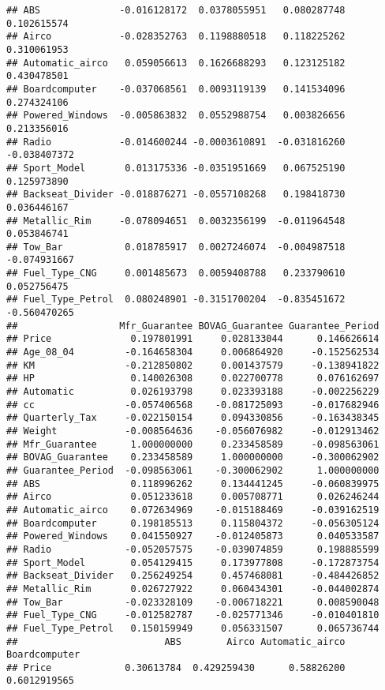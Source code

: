 \documentclass[]{article}
\begin{document}
\begin{verbatim}
## ABS              -0.016128172  0.0378055951   0.080287748  0.102615574
## Airco            -0.028352763  0.1198880518   0.118225262  0.310061953
## Automatic_airco   0.059056613  0.1626688293   0.123125182  0.430478501
## Boardcomputer    -0.037068561  0.0093119139   0.141534096  0.274324106
## Powered_Windows  -0.005863832  0.0552988754   0.003826656  0.213356016
## Radio            -0.014600244 -0.0003610891  -0.031816260 -0.038407372
## Sport_Model       0.013175336 -0.0351951669   0.067525190  0.125973890
## Backseat_Divider -0.018876271 -0.0557108268   0.198418730  0.036446167
## Metallic_Rim     -0.078094651  0.0032356199  -0.011964548  0.053846741
## Tow_Bar           0.018785917  0.0027246074  -0.004987518 -0.074931667
## Fuel_Type_CNG     0.001485673  0.0059408788   0.233790610  0.052756475
## Fuel_Type_Petrol  0.080248901 -0.3151700204  -0.835451672 -0.560470265
##                  Mfr_Guarantee BOVAG_Guarantee Guarantee_Period
## Price              0.197801991     0.028133044      0.146626614
## Age_08_04         -0.164658304     0.006864920     -0.152562534
## KM                -0.212850802     0.001437579     -0.138941822
## HP                 0.140026308     0.022700778      0.076162697
## Automatic          0.026193798     0.023393188     -0.002256229
## cc                -0.057406568    -0.081725093     -0.017682946
## Quarterly_Tax     -0.022150154     0.094330856     -0.163438345
## Weight            -0.008564636    -0.056076982     -0.012913462
## Mfr_Guarantee      1.000000000     0.233458589     -0.098563061
## BOVAG_Guarantee    0.233458589     1.000000000     -0.300062902
## Guarantee_Period  -0.098563061    -0.300062902      1.000000000
## ABS                0.118996262     0.134441245     -0.060839975
## Airco              0.051233618     0.005708771      0.026246244
## Automatic_airco    0.072634969    -0.015188469     -0.039162519
## Boardcomputer      0.198185513     0.115804372     -0.056305124
## Powered_Windows    0.041550927    -0.012405873      0.040533587
## Radio             -0.052057575    -0.039074859      0.198885599
## Sport_Model        0.054129415     0.173977808     -0.172873754
## Backseat_Divider   0.256249254     0.457468081     -0.484426852
## Metallic_Rim       0.026727922     0.060434301     -0.044002874
## Tow_Bar           -0.023328109    -0.006718221      0.008590048
## Fuel_Type_CNG     -0.012582787    -0.025771346     -0.010401810
## Fuel_Type_Petrol   0.150159949     0.056331507      0.065736744
##                          ABS        Airco Automatic_airco Boardcomputer
## Price             0.30613784  0.429259430      0.58826200  0.6012919565

\end{verbatim}
\end{document}
